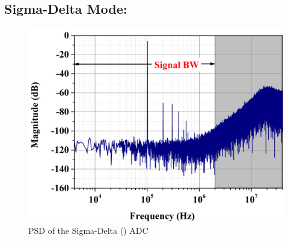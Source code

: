 \subsection{Sigma-Delta Mode:}
%
\begin{figure}[h!]
    \centering
    \includegraphics[width=0.8\columnwidth]{Chap06/Figures/PSD_SDM_meas.jpg}
    \caption{PSD of the Sigma-Delta (\textSigma \textDelta) ADC}
    \label{fig:sdm_psd}
\end{figure}
%

